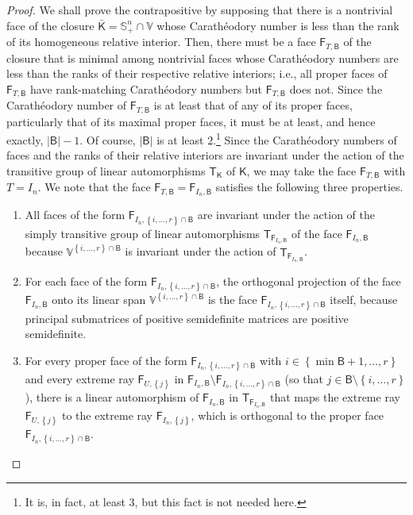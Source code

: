 \documentclass[oneside]{amsart}
\theoremstyle{plain}
\theoremstyle{definition}
\theoremstyle{remark}
\numberwithin{equation}{section}
\begin{document}
\begin{proof}
We shall prove the contrapositive by supposing that there is a nontrivial
face of the closure $\bar{\mathsf{K}} = \mathbb{S}^{n}_{+} \cap \mathbb{V}$
whose Carath\'eodory number is less than the rank of its homogeneous
relative interior. Then, there must be a face $\mathsf{F}_{T,\mathsf{B}}$
of the closure that is minimal among nontrivial faces whose Carath\'eodory
numbers are less than the ranks of their respective relative interiors;
i.e., all proper faces of $\mathsf{F}_{T,\mathsf{B}}$ have rank-matching
Carath\'eodory numbers but $\mathsf{F}_{T,\mathsf{B}}$ does not. Since the
Carath\'eodory number of $\mathsf{F}_{T,\mathsf{B}}$ is at least that of
any of its proper faces, particularly that of its maximal proper faces, it
must be at least, and hence exactly, $\lvert \mathsf{B} \rvert - 1$. Of
course, $\lvert \mathsf{B} \rvert$ is at least $2$.\footnote{It is, in
fact, at least $3$, but this fact is not needed here.} Since the
Carath\'eodory numbers of faces and the ranks of their relative interiors
are invariant under the action of the transitive group of linear
automorphisms $\mathsf{T}_{\mathsf{K}}$ of $\mathsf{K}$, we may take the
face $\mathsf{F}_{T,\mathsf{B}}$ with $T = I_{n}$. We note that the face
$\mathsf{F}_{T,\mathsf{B}} = \mathsf{F}_{I_{n},\mathsf{B}}$ satisfies the
following three properties.
\begin{enumerate}[label=(\roman*)]
\item All faces of the form $\mathsf{F}_{I_{n},\left\{i, \dotsc, r\right\}
\cap \mathsf{B}}$ are invariant under the action of the simply transitive
group of linear automorphisms $\mathsf{T}_{\mathsf{F}_{I_{n},\mathsf{B}}}$
of the face $\mathsf{F}_{I_{n},\mathsf{B}}$ because $\mathbb{V}^{\left\{i,
\dotsc, r\right\} \cap \mathsf{B}}$ is invariant under the action of
$\mathsf{T}_{\mathsf{F}_{I_{n},\mathsf{B}}}$.

\item For each face of the form $\mathsf{F}_{I_{n},\left\{i, \dotsc,
r\right\} \cap \mathsf{B}}$, the orthogonal projection of the face
$\mathsf{F}_{I_{n},\mathsf{B}}$ onto its linear span $\mathbb{V}^{\left\{i,
\dotsc, r\right\} \cap \mathsf{B}}$ is the face
$\mathsf{F}_{I_{n},\left\{i, \dotsc, r\right\} \cap \mathsf{B}}$ itself,
because principal submatrices of positive semidefinite matrices are
positive semidefinite.

\item For every proper face of the form $\mathsf{F}_{I_{n},\left\{i,
\dotsc, r\right\} \cap \mathsf{B}}$ with $i \in \left\{\min \mathsf{B}+1,
\dotsc, r\right\}$ and every extreme ray $\mathsf{F}_{U,\left\{j\right\}}$
in $\mathsf{F}_{I_{n},\mathsf{B}} \setminus \mathsf{F}_{I_{n},\left\{i,
\dotsc, r\right\} \cap \mathsf{B}}$ (so that $j \in \mathsf{B} \setminus
\left\{i, \dotsc, r\right\}$), there is a linear automorphism of
$\mathsf{F}_{I_{n},\mathsf{B}}$ in
$\mathsf{T}_{\mathsf{F}_{I_{n},\mathsf{B}}}$ that maps the extreme ray
$\mathsf{F}_{U,\left\{j\right\}}$ to the extreme ray
$\mathsf{F}_{I_{n},\left\{j\right\}}$, which is orthogonal to the proper
face $\mathsf{F}_{I_{n},\left\{i, \dotsc, r\right\} \cap \mathsf{B}}$.


\end{enumerate}
\end{proof}
\end{document}

